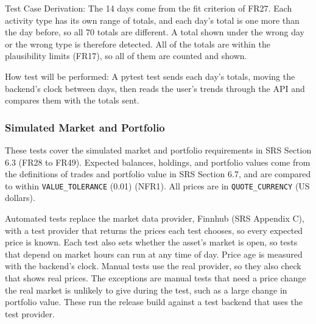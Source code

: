 \documentclass[12pt, titlepage]{article}
\begin{document}
\begin{enumerate}
Test Case Derivation: The 14 days come from the fit criterion of FR27. Each
activity type has its own range of totals, and each day's total is one more
than the day before, so all 70 totals are different. A total shown under the
wrong day or the wrong type is therefore detected. All of the totals are
within the plausibility limits (FR17), so all of them are counted and shown.

How test will be performed: A pytest test sends each day's totals, moving the
backend's clock between days, then reads the user's trends through the API
and compares them with the totals sent.

\end{enumerate}

\subsubsection{Simulated Market and Portfolio}

These tests cover the simulated market and portfolio requirements in SRS
Section 6.3 (FR28 to FR49). Expected balances, holdings, and portfolio values
come from the definitions of trades and portfolio value in SRS Section 6.7,
and are compared to within \texttt{VALUE\_TOLERANCE} (0.01) (NFR1). All
prices are in \texttt{QUOTE\_CURRENCY} (US dollars).

Automated tests replace the market data provider, Finnhub (SRS Appendix C),
with a test provider that returns the prices each test chooses, so every
expected price is known. Each test also sets whether the asset's market is
open, so tests that depend on market hours can run at any time of day. Price
age is measured with the backend's clock. Manual tests use the real provider,
so they also check that \progname{} shows real prices. The exceptions are
manual tests that need a price change the real market is unlikely to give
during the test, such as a large change in portfolio value. These run the
release build against a test backend that uses the test provider.
\end{document}
